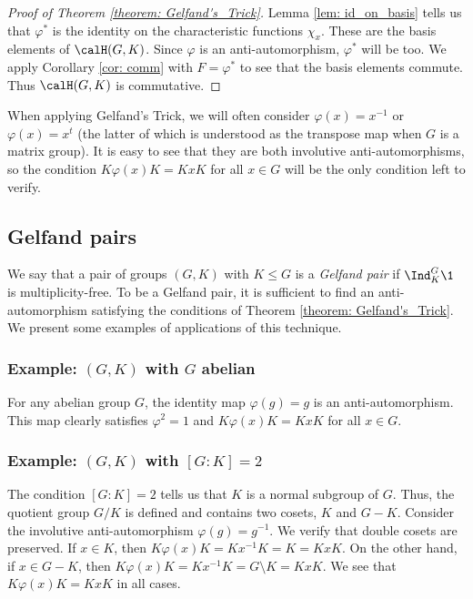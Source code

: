 \begin{proof}[Proof of Theorem \ref{theorem: Gelfand's_Trick}]
	Lemma \ref{lem: id_on_basis} tells us that $\varphi^\ast$ is the identity on the characteristic functions $\chi_x$.
	These are the basis elements of $\calH(G,K)$.
	Since $\varphi$ is an anti-automorphism, $\varphi^\ast$ will be too.
	We apply Corollary \ref{cor: comm} with $F=\varphi^\ast$ to see that the basis elements commute.
	Thus $\calH(G,K)$ is commutative.
\end{proof}
When applying Gelfand's Trick, we will often consider $\varphi(x)=x^{-1}$ or $\varphi(x)=x^t$ (the latter of which is understood as the transpose map when $G$ is a matrix group).
It is easy to see that they are both involutive anti-automorphisms, so the condition $K\varphi(x)K=KxK$ for all $x\in G$ will be the only condition left to verify.


\subsection{Gelfand pairs}\label{Section1.8}
We say that a pair of groups $(G,K)$ with $K\leq G$ is a \emph{Gelfand pair} if $\Ind_K^G \1$ is multiplicity-free.
To be a Gelfand pair, it is sufficient to find an anti-automorphism satisfying the conditions of Theorem \ref{theorem: Gelfand's_Trick}.
We present some examples of applications of this technique.

\subsubsection{Example: $(G,K)$ with $G$ abelian}
For any abelian group $G$, the identity map $\varphi(g)=g$ is an anti-automorphism.
This map clearly satisfies $\varphi^2=1$ and $K\varphi(x)K=KxK$ for all $x\in G$.

\subsubsection{Example: $(G,K)$ with $[G\! :\! K]=2$}
The condition $[G\! :\! K]=2$ tells us that $K$ is a normal subgroup of $G$.
Thus, the quotient group $G/K$ is defined and contains two cosets, $K$ and $G- K$.
Consider the involutive anti-automorphism $\varphi(g)=g^{-1}$.
We verify that double cosets are preserved.
If $x\in K$, then $K\varphi(x)K = Kx^{-1}K = K = KxK$.
On the other hand, if $x\in G- K$, then $K\varphi(x)K = Kx^{-1}K = G\setminus K = KxK$.
We see that $K\varphi(x)K=KxK$ in all cases.


